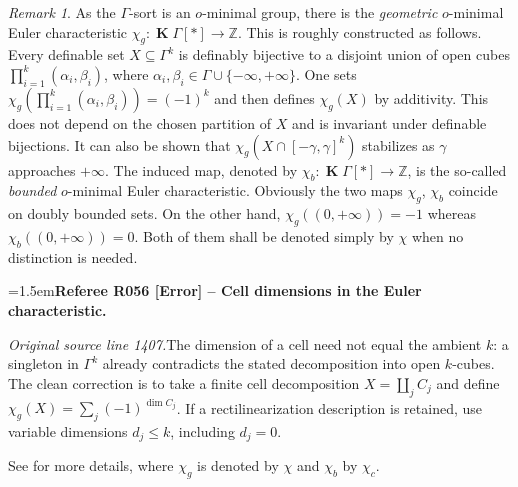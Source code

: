 \documentclass[12pt]{amsart}
\newcommand{\RefereeRemark}[4]{%
  \par\medskip\begingroup\normalfont\small\color{RefereePurple}%
  \emergencystretch=1.5em\noindent\textbf{Referee R#1 [#2] -- #3.}\par\nobreak\noindent #4\par
  \endgroup\medskip
}
\newcommand{\memph}[1]{{\color{magenta}\emph{#1}}}
\theoremstyle{plain}
\theoremstyle{definition}
\theoremstyle{remark}
\newtheorem{rem}[thm]{Remark}
\numberwithin{equation}{section}
\theoremstyle{plain}
\newcommand{\Z}{\mathds{Z}}
\newcommand{\omin}{$o$\nobreakdash}
\newcommand{\0}{\emptyset}
\newcommand{\fun}{\longrightarrow}
\newcommand{\sub}{\subseteq}
\DeclareMathOperator{\ggk}{\mathbf{K}}
\begin{document}
\begin{rem}
As  the  $\Gamma$-sort is an \omin-minimal group, there is  the \memph{geometric} \omin-minimal Euler characteristic  $\chi_g : \ggk \Gamma[*] \fun \Z$. This is roughly constructed as follows. Every definable set $X \sub \Gamma^k$ is definably bijective to a disjoint union of open cubes $\prod^k_{i= 1}(\alpha_i,\beta_i)$, where $\alpha_i, \beta_i \in \Gamma \cup \{-\infty, +\infty\}$. One sets $\chi_g(\prod^k_{i= 1}(\alpha_i,\beta_i)) = (-1)^k$ and then defines $\chi_g(X)$ by additivity. This does not depend on the chosen partition of $X$ and is invariant under definable bijections. It can also be shown that $\chi_g(X \cap [-\gamma, \gamma]^k)$ stabilizes as $\gamma$ approaches $+\infty$. The induced map, denoted by $\chi_b: \ggk \Gamma[*] \fun \Z$,  is the so-called \memph{bounded} \omin-minimal Euler characteristic. Obviously the two maps $\chi_g$, $\chi_b$  coincide on doubly bounded sets. On the other hand,  $\chi_g((0,+\infty))=-1$ whereas $\chi_b((0,+\infty))=0$. Both of them shall be denoted simply by $\chi$ when no distinction is needed.

\RefereeRemark{056}{Error}{Cell dimensions in the Euler characteristic}{%
\textit{Original source line 1407.}\quad The dimension of a cell need not equal the ambient $k$: a singleton in $\Gamma^k$ already contradicts the stated decomposition into open $k$-cubes. The clean correction is to take a finite cell decomposition $X=\coprod_j C_j$ and define $\chi_g(X)=\sum_j(-1)^{\dim C_j}$. If a rectilinearization description is retained, use variable dimensions $d_j\leq k$, including $d_j=0$.
}

See \cite[\S~9]{hrushovski:kazhdan:integration:vf} for more details, where $\chi_g$ is denoted by $\chi$ and $\chi_b$ by $\chi_c$.
\end{rem}
\end{document}

